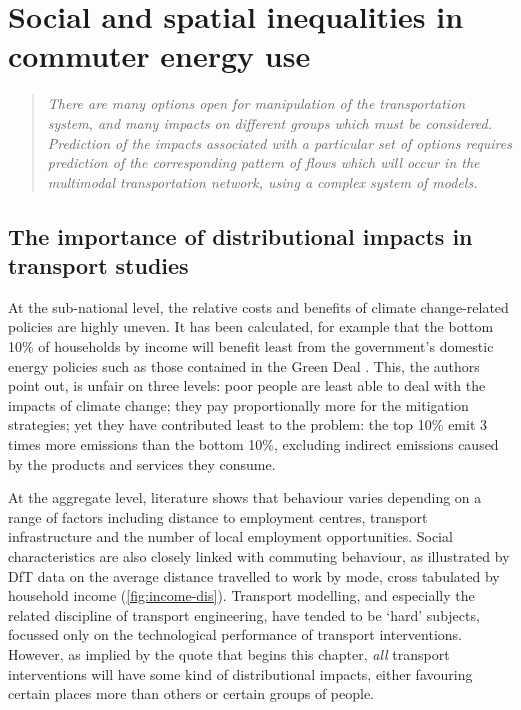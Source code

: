 
\chapter{Social and spatial inequalities in commuter energy use} %
\label{Chapter7}
\fancyhead[RE,LO]{\thepage}
\begin{quotation}
\textit{ There  are many options open  for manipulation of the transportation
system,
and many  impacts on different groups which must
be considered. Prediction of the impacts associated with
a particular set of options requires prediction of the corresponding
pattern of flows which will occur in the multimodal transportation
network, using a complex system of models.}
\end{quotation} {\flushright \citep{manheim1968search}}

\section{The importance of distributional impacts in transport studies}
At the sub-national level, the relative costs and benefits of climate change-related
policies are highly uneven. It has been calculated, for example that the bottom
10\% of households by income will benefit least from the government's domestic
energy policies such as those contained in the Green Deal \citep{JRF2013-distributions}.
This, the authors point out, is unfair on three levels: poor people are least
able to deal with the impacts of climate change; they pay proportionally more for the
mitigation strategies; yet they have contributed least to the problem: the top
10\% emit 3 times more emissions than the bottom 10\%, excluding indirect emissions
caused by the products and services they consume.

At the aggregate level, literature shows that behaviour varies depending
on a range of factors including distance to employment
centres,
transport infrastructure and the number of local employment opportunities.
Social characteristics are also closely linked with commuting behaviour,
as illustrated by DfT data on the average distance travelled to work
by mode, cross tabulated by household income (\cref{fig:income-dis}). Transport
modelling, and especially the related discipline of transport engineering, have
tended to be `hard' subjects, focussed only on the technological performance of
transport interventions. However, as implied by the quote that begins this
chapter, \emph{all} transport interventions will have some kind of
distributional impacts, either favouring certain places more than others or
certain groups of people.

